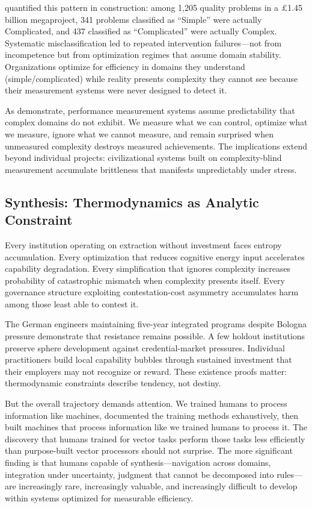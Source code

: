 \citet{ford2024} quantified this pattern in construction: among 1,205 quality problems in a £1.45 billion megaproject, 341 problems classified as ``Simple'' were actually Complicated, and 437 classified as ``Complicated'' were actually Complex. Systematic misclassification led to repeated intervention failures—not from incompetence but from optimization regimes that assume domain stability. Organizations optimize for efficiency in domains they understand (simple/complicated) while reality presents complexity they cannot see because their measurement systems were never designed to detect it.

As \citet{alexander2018} demonstrate, performance measurement systems assume predictability that complex domains do not exhibit. We measure what we can control, optimize what we measure, ignore what we cannot measure, and remain surprised when unmeasured complexity destroys measured achievements. The implications extend beyond individual projects: civilizational systems built on complexity-blind measurement accumulate brittleness that manifests unpredictably under stress.

\subsection{Synthesis: Thermodynamics as Analytic Constraint}

Every institution operating on extraction without investment faces entropy accumulation. Every optimization that reduces cognitive energy input accelerates capability degradation. Every simplification that ignores complexity increases probability of catastrophic mismatch when complexity presents itself. Every governance structure exploiting contestation-cost asymmetry accumulates harm among those least able to contest it.

The German engineers maintaining five-year integrated programs despite Bologna pressure demonstrate that resistance remains possible. A few holdout institutions preserve sphere development against credential-market pressures. Individual practitioners build local capability bubbles through sustained investment that their employers may not recognize or reward. These existence proofs matter: thermodynamic constraints describe tendency, not destiny.

But the overall trajectory demands attention. We trained humans to process information like machines, documented the training methods exhaustively, then built machines that process information like we trained humans to process it. The discovery that humans trained for vector tasks perform those tasks less efficiently than purpose-built vector processors should not surprise. The more significant finding is that humans capable of synthesis—navigation across domains, integration under uncertainty, judgment that cannot be decomposed into rules—are increasingly rare, increasingly valuable, and increasingly difficult to develop within systems optimized for measurable efficiency.

